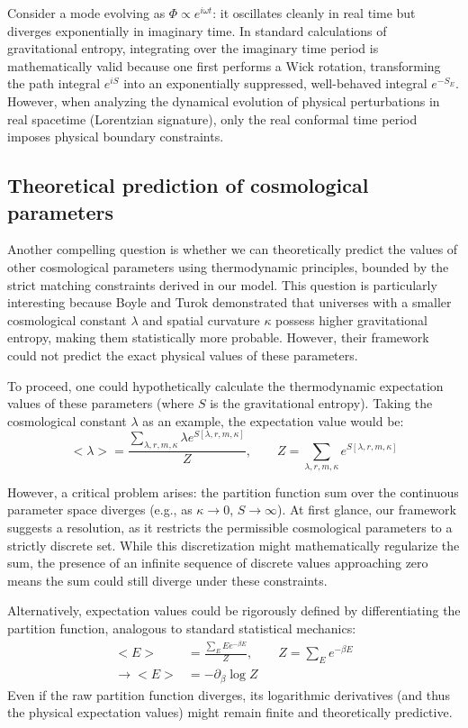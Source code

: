 Consider a mode evolving as $\Phi\propto e^{i\omega t}$: it oscillates cleanly in real time but diverges exponentially in imaginary time. In standard calculations of gravitational entropy, integrating over the imaginary time period is mathematically valid because one first performs a Wick rotation, transforming the path integral $e^{iS}$ into an exponentially suppressed, well-behaved integral $e^{-S_E}$. However, when analyzing the dynamical evolution of physical perturbations in real spacetime (Lorentzian signature), only the real conformal time period imposes physical boundary constraints.

\subsection{Theoretical prediction of cosmological parameters}
Another compelling question is whether we can theoretically predict the values of other cosmological parameters using thermodynamic principles, bounded by the strict matching constraints derived in our model. This question is particularly interesting because Boyle and Turok \cite{2024PhLB..84938442B} demonstrated that universes with a smaller cosmological constant $\lambda$ and spatial curvature $\kappa$ possess higher gravitational entropy, making them statistically more probable. However, their framework could not predict the exact physical values of these parameters. 

To proceed, one could hypothetically calculate the thermodynamic expectation values of these parameters (where $S$ is the gravitational entropy). Taking the cosmological constant $\lambda$ as an example, the expectation value would be: 
\[ \big<\lambda\big>=\frac{\sum_{\lambda,r,m,\kappa}\lambda e^{S[\lambda,r,m,\kappa]}}{Z},\qquad Z=\sum_{\lambda,r,m,\kappa} e^{S[\lambda,r,m,\kappa]} \]

However, a critical problem arises: the partition function sum over the continuous parameter space diverges (e.g., as $\kappa\rightarrow 0$, $S\rightarrow\infty$). At first glance, our framework suggests a resolution, as it restricts the permissible cosmological parameters to a strictly discrete set. While this discretization might mathematically regularize the sum, the presence of an infinite sequence of discrete values approaching zero means the sum could still diverge under these constraints.

Alternatively, expectation values could be rigorously defined by differentiating the partition function, analogous to standard statistical mechanics: 
\begin{equation}
\begin{aligned}
    \big<E\big>&=\frac{\sum_E Ee^{-\beta E}}{Z},\qquad Z=\sum_E e^{-\beta E}\\
\rightarrow \big<E\big>&=-\partial_{\beta}\log Z
\end{aligned}
\end{equation}
Even if the raw partition function diverges, its logarithmic derivatives (and thus the physical expectation values) might remain finite and theoretically predictive.

